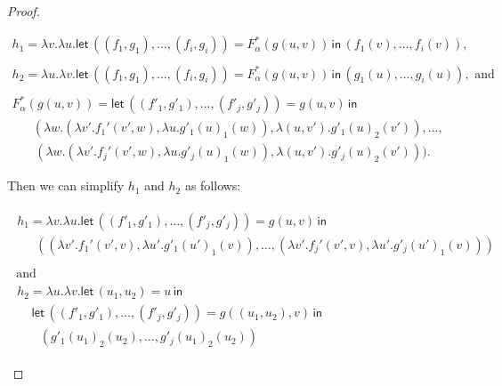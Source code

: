 \begin{proof}
\begin{report}
\begin{center}
\begin{itemize}
\begin{center}
\begin{math}
\begin{array}{lll}
            h_1 = \lambda v.\lambda u.\mathsf{let}\,((f_1,g_1),\ldots,(f_i,g_i)) = F^*_\alpha(g(u,v))\,\mathsf{in}\,
            (f_1(v),\ldots,f_i(v)),\\
            \\
            h_2 = \lambda u.\lambda v.\mathsf{let}\,((f_1,g_1),\ldots,(f_i,g_i)) = F^*_\alpha(g(u,v)) \,\mathsf{in}\,
           (g_1(u),\ldots,g_i(u)), \text{ and }\\
           \\
           F^*_\alpha(g(u,v)) = \mathsf{let}\, ((f'_1,g'_1),\ldots,(f'_j,g'_j)) = g(u,v) \,\mathsf{in}\,\\
      \,\,\,\,\,\,\,\,\,\,(\lambda w.(\lambda v'.f_1'(v',w),\lambda u.g'_1(u)_1(w)),\lambda (u,v').g'_1(u)_2(v')),\ldots,\\
      \,\,\,\,\,\,\,\,\,\,\,(\lambda w.(\lambda v'.f_j'(v',w),\lambda u.g'_j(u)_1(w)),\lambda (u,v').g'_j(u)_2(v'))).
          \end{array}
        \end{math}
      \end{center}
      Then we can simplify $h_1$ and $h_2$ as follows:
      \begin{center}
        \begin{math}
          \begin{array}{lll}
            \begin{array}{lll}
              h_1 = \lambda v.\lambda u.\mathsf{let}\,((f'_1,g'_1),\ldots,(f'_j,g'_j)) = g(u,v)\,\mathsf{in}\,\\
              \,\,\,\,\,\,\,\,\,((\lambda v'.f_1'(v',v),\lambda u'.g'_1(u')_1(v)),\ldots,(\lambda v'.f_j'(v',v),\lambda u'.g'_j(u')_1(v))) \\
            \end{array}\\
            \text{ and }\\
            \begin{array}{lll}
              h_2 = \lambda u.\lambda v.\mathsf{let}\,(u_1,u_2) = u\,\mathsf{in}\, \\
              \,\,\,\,\,\,\,\mathsf{let}\,((f'_1,g'_1),\ldots,(f'_j,g'_j)) = g((u_1,u_2),v) \,\mathsf{in}\,\\
              \,\,\,\,\,\,\,\,\,\,\,(g'_1(u_1)_2(u_2),\ldots,g'_j(u_1)_2(u_2))
            \end{array}
          \end{array}
        \end{math}
      \end{center}

\end{itemize}
\end{center}
\end{report}
\end{proof}
